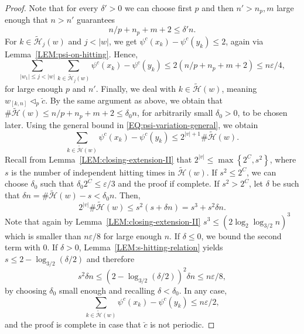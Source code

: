 \documentclass[10pt,a4paper]{amsart}
\newcommand{\mc}{\mathcal}
\begin{document}
\begin{proof}
Note that for every $\delta'>0$ we can choose first $p$ and then $n' > n_p,m$ large enough that $n>n'$ guarantees
\[
n/p + n_p + m + 2\leqslant \delta' n.
\]
For $k \in \widetilde{\mc H}_j(w)$ and $j < |w|$, we get $\psi^c(x_k) - \psi^c(y_k) \leqslant 2$, again via Lemma~\ref{LEM:psi-on-hitting}. Hence,
\[
\sum_{|w_1| \leqslant j < |w|} \sum_{k \in \widetilde{\mc H}_j(w)} \psi^c(x_k) - \psi^c(y_k) \leqslant 2 (n/p + n_p + m + 2) \leqslant n \varepsilon/4,
\]
for large enough $p$ and $n'$. 
Finally, we deal with $k \in \widetilde{\mc H}(w)$, meaning $w_{[k,n]} \triangleleft_p \breve{c}$. By the same argument as above, we obtain that $\# \widetilde{\mc H}(w) \leqslant n/p + n_p + m + 2 \leqslant \delta_0 n$, for arbitrarily small $\delta_0>0$, to be chosen later. 
Using the general bound in \eqref{EQ:psi-variation-general}, we obtain
\[
\sum_{k \in \widetilde{\mc H}(w)} \psi^c(x_k) - \psi^c(y_k) \leqslant 2^{|v| +1} \# \widetilde{\mc H}(w).
\]
Recall from Lemma~\ref{LEM:closing-extension-II} that $2^{|v|} \leqslant \max\left\{2^C, s^2\right\}$, where $s$ is the number of independent hitting times in $\widetilde{\mc H}(w)$.
If $s^2 \leqslant 2^C$, we can choose $\delta_0$ such that $\delta_0 2^C \leqslant \varepsilon /3$ and the proof if complete. If $s^2 > 2^C$, let $\delta$ be such that $\delta n = \# \widetilde{\mc H}(w) - s < \delta_0 n$. Then,
\[
2^{|v|} \# \widetilde{\mc H}(w)
\leqslant s^2 (s+ \delta n) = s^3 + s^2 \delta n.
\]
Note that again by Lemma~\ref{LEM:closing-extension-II} $s^3 \leqslant (2 \log_2 \log_{3/2} n)^3$ which is smaller than $n \varepsilon/8$ for large enough $n$. If $\delta \leqslant 0$, we bound the second term with $0$. 
If $\delta>0$, Lemma~\ref{LEM:s-hitting-relation} yields $s \leqslant 2 - \log_{3/2}(\delta/2)$ 
and therefore
\[
s^2 \delta n \leqslant  (2- \log_{3/2}(\delta/2) )^2 \delta n \leqslant n \varepsilon/8,
\]
by choosing $\delta_0$ small enough and recalling $\delta < \delta_0$. In any case,
\[
\sum_{k \in \widetilde{\mc H}(w)} \psi^c(x_k) - \psi^c(y_k) \leqslant n \varepsilon/2,
\]
and the proof is complete in case that $\breve{c}$ is not periodic.


\end{proof}
\end{document}
